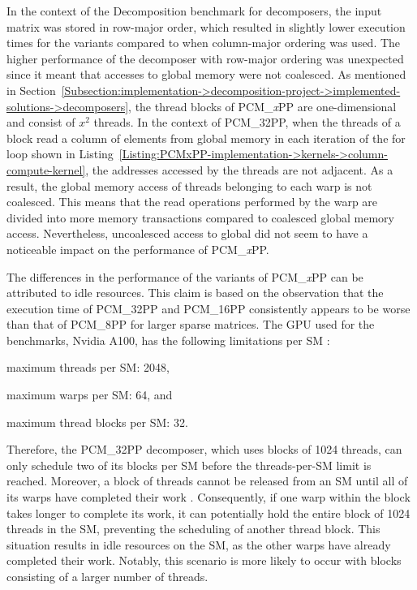 In the context of the Decomposition benchmark for decomposers, the input matrix was stored in row-major order, which resulted in slightly lower execution times for the variants compared to when column-major ordering was used.
The higher performance of the decomposer with row-major ordering was unexpected since it meant that accesses to global memory were not coalesced.
As mentioned in Section~\ref{Subsection:implementation->decomposition-project->implemented-solutions->decomposers}, the thread blocks of PCM\_\textit{x}PP are one-dimensional and consist of $x^2$ threads.
In the context of PCM\_32PP, when the threads of a block read a column of elements from global memory in each iteration of the for loop shown in Listing~\ref{Listing:PCMxPP-implementation->kernels->column-compute-kernel}, the addresses accessed by the threads are not adjacent.
As a result, the global memory access of threads belonging to each warp is not coalesced.
This means that the read operations performed by the warp are divided into more memory transactions compared to coalesced global memory access.
Nevertheless, uncoalesced access to global did not seem to have a noticeable impact on the performance of PCM\_\textit{x}PP.

The differences in the performance of the variants of PCM\_\textit{x}PP can be attributed to idle resources.
This claim is based on the observation that the execution time of PCM\_32PP and PCM\_16PP consistently appears to be worse than that of PCM\_8PP for larger sparse matrices.
The GPU used for the benchmarks, Nvidia A100, has the following limitations per SM \cite{rfiOEXAGDlcAOxF3}:

\begin{tight_enumerate}
	\item maximum threads per SM: 2048,
	\item maximum warps per SM: 64, and
	\item maximum thread blocks per SM: 32.
\end{tight_enumerate}

Therefore, the PCM\_32PP decomposer, which uses blocks of 1024 threads, can only schedule two of its blocks per SM before the threads-per-SM limit is reached.
Moreover, a block of threads cannot be released from an SM until all of its warps have completed their work \cite{Cheng2014}.
Consequently, if one warp within the block takes longer to complete its work, it can potentially hold the entire block of 1024 threads in the SM, preventing the scheduling of another thread block.
This situation results in idle resources on the SM, as the other warps have already completed their work.
Notably, this scenario is more likely to occur with blocks consisting of a larger number of threads.

